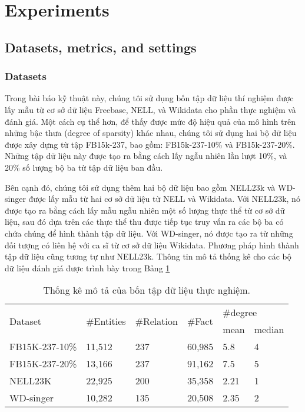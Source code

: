 \section{Experiments}

\subsection{Datasets, metrics, and settings}

\subsubsection{Datasets}

Trong bài báo kỹ thuật này, chúng tôi sử dụng bốn tập dữ liệu thí nghiệm được lấy mẫu từ cơ sở dữ liệu Freebase\cite{bollacker2008freebase}, NELL\cite{carlson2010toward}, và Wikidata\cite{vrandevcic2014wikidata} cho phần thực nghiệm và đánh giá. Một cách cụ thể hơn, để thấy được mức độ hiệu quả của mô hình trên những bậc thưa (degree of sparsity) khác nhau, chúng tôi sử dụng hai bộ dữ liệu được xây dựng từ tập FB15k-237\cite{toutanova2015representing}, bao gồm: FB15k-237-10\% và FB15k-237-20\%. Những tập dữ liệu này được tạo ra bằng cách lấy ngẫu nhiên lần lượt 10\%, và 20\% số lượng bộ ba từ tập dữ liệu ban đầu.

Bên cạnh đó, chúng tôi sử dụng thêm hai bộ dữ liệu bao gồm NELL23k và WD-singer được lấy mẫu từ hai cơ sở dữ liệu từ NELL và Wikidata. Với NELL23k, nó được tạo ra bằng cách lấy mẫu ngẫu nhiên một số lượng thực thể từ cơ sở dữ liệu, sau đó dựa trên các thực thể thu được tiếp tục truy vấn ra các bộ ba có chứa chúng để hình thành tập dữ liệu. Với WD-singer, nó được tạo ra từ những đối tượng có liên hệ với ca sĩ từ cơ sở dữ liệu Wikidata. Phương pháp hình thành tập dữ liệu cũng tương tự như NELL23k. Thông tin mô tả thống kê cho các bộ dữ liệu đánh giá được trình bày trong Bảng \ref{tab:dataset}

\begin{center}
    \begin{table}[H]
        \label{tab:dataset}
        \centering
        \caption{Thống kê mô tả của bốn tập dữ liệu thực nghiệm.}
        \begin{tabular}{llllll}
        \toprule
        \multirow{2}{*}{Dataset} & \multirow{2}{*}{\#Entities} & \multirow{2}{*}{\#Relation} & \multirow{2}{*}{\#Fact} & \multicolumn{2}{l}{\#degree}    \\ \cline{5-6}
        &&&& \multicolumn{1}{l}{mean} & median \\ \midrule
        FB15K-237-10\%&11,512&237&60,985&\multicolumn{1}{l}{5.8}&4\\
        FB15K-237-20\%&13,166&237&91,162&\multicolumn{1}{l}{7.5}&5\\
        NELL23K&22,925&200&35,358&\multicolumn{1}{l}{2.21}&1\\
        WD-singer&10,282&135&20,508&\multicolumn{1}{l}{2.35}&2\\
        \bottomrule
        \end{tabular}
    \end{table}
\end{center}

